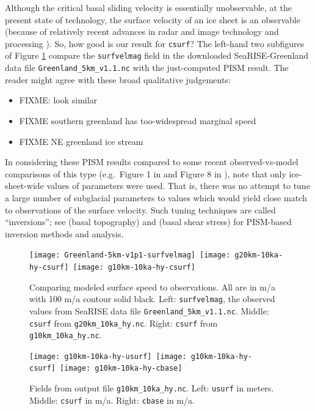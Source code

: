 Although the critical basal sliding velocity is essentially unobservable, at the present state of technology, the surface velocity of an ice sheet is an observable (because of relatively recent advances in radar and image technology and processing \cite{Joughin2002}).  So, how good is our result for \texttt{csurf}?  The left-hand two subfigures of Figure \ref{fig:csurfvsobserved} compare the \texttt{surfvelmag} field in the downloaded SeaRISE-Greenland data file \texttt{Greenland_5km_v1.1.nc} with the just-computed PISM result.  The reader might agree with these broad qualitative judgements:
\begin{itemize}
\item FIXME: look similar
\item FIXME  southern greenland has too-widespread marginal speed
\item FIXME  NE greenland ice stream 
\end{itemize}
In considering these PISM results compared to some recent observed-vs-model comparisons of this type (e.g.~Figure 1 in \cite{Priceetal2011} and Figure 8 in \cite{Larouretal2012}), note that only ice-sheet-wide values of parameters were used.  That is, there was no attempt to tune a large number of subglacial parameters to values which would yield close match to observations of the surface velocity.  Such tuning techniques are called ``inversions''; see \cite{vanPeltetal2013} (basal topography) and \cite{Habermannetal2013} (basal shear stress) for PISM-based inversion methods and analysis.

\begin{figure}[ht]
\centering
\mbox{\texttt{[image: Greenland-5km-v1p1-surfvelmag]} \texttt{[image: g20km-10ka-hy-csurf]} \texttt{[image: g10km-10ka-hy-csurf]}}
\caption{Comparing modeled surface speed to observations.  All are in m/a with 100 m/a contour solid black.  Left: \texttt{surfvelmag}, the observed values from SeaRISE data file \texttt{Greenland_5km_v1.1.nc}.  Middle: \texttt{csurf} from \texttt{g20km_10ka_hy.nc}.  Right: \texttt{csurf} from \texttt{g10km_10ka_hy.nc}.}
\label{fig:csurfvsobserved}
\end{figure}

\begin{figure}[ht]
\centering
\mbox{\texttt{[image: g10km-10ka-hy-usurf]} \texttt{[image: g10km-10ka-hy-csurf]} \texttt{[image: g10km-10ka-hy-cbase]}}
\caption{Fields from output file \texttt{g10km_10ka_hy.nc}.  Left: \texttt{usurf} in meters.  Middle: \texttt{csurf} in m/a.  Right: \texttt{cbase} in m/a.}
\label{fig:secondoutputfiner}
\end{figure}

